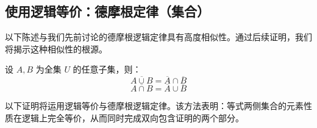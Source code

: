 \subsection{使用逻辑等价：德摩根定律（集合）}\label{sec:section4.6.6}

以下陈述与我们先前讨论的德摩根逻辑定律具有高度相似性。通过后续证明，我们将揭示这种相似性的根源。

\begin{theorem}\label{theorem4.6.9}
    设 $A, B$ 为全集 $U$ 的任意子集，则：
    \[\overline{A \cup B} = \overline{A} \cap \overline{B}\]
    \[\overline{A \cap B} = \overline{A} \cup \overline{B}\]
\end{theorem}

以下证明将运用逻辑等价与德摩根逻辑定律。该方法表明：等式两侧集合的元素性质在逻辑上完全等价，从而同时完成双向包含证明的两个部分。

